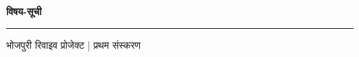 \documentclass[12pt,a4paper,oneside]{article}
\begin{document}
\begin{center}
  {\Large \bfseries \color{bordercolor} विषय-सूची} \\[0.4em]
  {\color{bordercolor}\rule{0.3\textwidth}{0.8pt}}
\end{center}

\vspace*{0.6cm}
\renewcommand{\contentsname}{}
\setcounter{tocdepth}{2}
{\makeatletter
\renewcommand{\@dotsep}{4.5}
\makeatother
\tableofcontents}

\vfill
\begin{center}
  {\small \color{bordercolor} भोजपुरी रिवाइव प्रोजेक्ट | प्रथम संस्करण {}}
\end{center}

\newpage
{}







\end{document}

